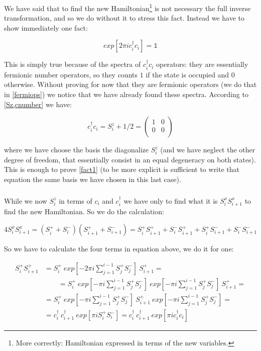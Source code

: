 We have said that to find the new Hamiltonian\footnote{More correctly: Hamiltonian expressed in terms of the new variables.} is not necessary the full inverse transformation, and so we do without it to stress this fact. Instead we have to show immediately one fact:

\begin{equation}
exp[2\pi i c_i^\dagger c_i] = \mathbb{1}
\label{fact1}
\end{equation}

This is simply true because of the spectra of $c_i^\dagger c_i$ operators: they are essentially fermionic number operators, so they counts $1$ if the state is occupied and $0$ otherwise. Without proving for now that they are fermionic operators (we do that in \cref{fermiops}) we notice that we have already found these spectra. According to \cref{Sz,cnumber} we have:

\begin{equation}
c_i^\dagger c_i = S_i^z + 1/2 = \begin{pmatrix}
1 & 0\\
0 & 0\\
\end{pmatrix}
\label{numinabasis}
\end{equation}

\noindent where we have choose the basis the diagonalize $S_i^z$ (and we have neglect the other degree of freedom, that essentially consist in an equal degeneracy on both states). This is enough to prove \cref{fact1} (to be more explicit is sufficient to write that equation the same basis we have chosen in this last case).

\subparagraph{}While we now $S_i^z$ in terms of $c_i$ and $c_i^\dagger$ we have only to find what it is $S_i^x S_{i+1}^x$ to find the new Hamiltonian. So we do the calculation:

\begin{equation*}
4 S_i^x S_{i+1}^x = (S_i^+ + S_i^-)(S_{i+1}^+ + S_{i+1}^-) = S_i^+ S_{i+1}^+ + S_i^- S_{i+1}^+ + S_i^+ S_{i+1}^- + S_i^- S_{i+1}^-
\end{equation*}

So we have to calculate the four terms in equation above, we do it for one:

\begin{align*}
S_i^+ S_{i+1}^+ &= S_i^+~exp[- 2\pi i  \sum_{j=1}^{i-1} S_j^+ S_j^-]~S_{i+1}^+ =\\
& \qquad = S_i^+ ~exp[- \pi i  \sum_{j=1}^{i-1} S_j^+ S_j^-]~exp[- \pi i  \sum_{j=1}^{i-1} S_j^+ S_j^-]~ S_{i+1}^+ =\\
&= S_i^+~exp[- \pi i  \sum_{j=1}^{i-1} S_j^+ S_j^-]~S_{i+1}^+~exp[- \pi i  \sum_{j=1}^{i-1} S_j^+ S_j^-] =\\
&= c_i^\dagger~c_{i+1}^\dagger~exp[\pi i S_i^+ S_i^-] = c_i^\dagger~c_{i+1}^\dagger~exp[\pi i c_i^\dagger c_i]
\end{align*}

